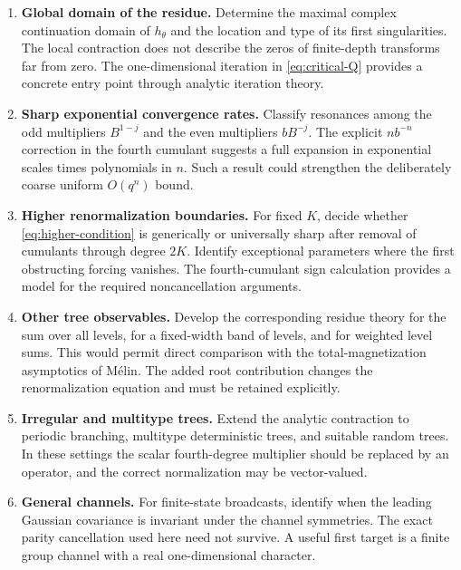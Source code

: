 \documentclass[11pt]{article}
\theoremstyle{definition}
\begin{document}
\begin{enumerate}[leftmargin=*,itemsep=6pt]
\item \textbf{Global domain of the residue.}
Determine the maximal complex continuation domain of $h_\theta$ and
the location and type of its first singularities. The local contraction
does not describe the zeros of finite-depth transforms far from zero.
The one-dimensional iteration in \eqref{eq:critical-Q} provides a
concrete entry point through analytic iteration theory.

\item \textbf{Sharp exponential convergence rates.}
Classify resonances among the odd multipliers $B^{1-j}$ and the even
multipliers $bB^{-j}$. The explicit $n b^{-n}$ correction in the
fourth cumulant suggests a full expansion in exponential scales times
polynomials in $n$. Such a result could strengthen the deliberately
coarse uniform $O(q^n)$ bound.

\item \textbf{Higher renormalization boundaries.}
For fixed $K$, decide whether \eqref{eq:higher-condition} is generically
or universally sharp after removal of cumulants through degree $2K$.
Identify exceptional parameters where the first obstructing forcing
vanishes. The fourth-cumulant sign calculation provides a model for
the required noncancellation arguments.

\item \textbf{Other tree observables.}
Develop the corresponding residue theory for the sum over all levels,
for a fixed-width band of levels, and for weighted level sums. This
would permit direct comparison with the total-magnetization
asymptotics of M\'elin. The added root contribution changes the
renormalization equation and must be retained explicitly.

\item \textbf{Irregular and multitype trees.}
Extend the analytic contraction to periodic branching, multitype
deterministic trees, and suitable random trees. In these settings the
scalar fourth-degree multiplier should be replaced by an operator,
and the correct normalization may be vector-valued.

\item \textbf{General channels.}
For finite-state broadcasts, identify when the leading Gaussian
covariance is invariant under the channel symmetries. The exact
parity cancellation used here need not survive. A useful first target
is a finite group channel with a real one-dimensional character.


\end{enumerate}
\end{document}
